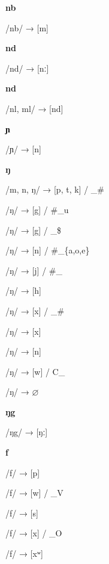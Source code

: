 \begin{center}\textbf{nb}\end{center}
\begin{multicols}{4}
\noindent /nb/ → [m]
\end{multicols}


\begin{center}\textbf{nd}\end{center}
\begin{multicols}{4}
\noindent /nd/ → [nː]
\end{multicols}


\begin{center}\textbf{nd}\end{center}
\begin{multicols}{4}
\noindent /nl, ml/ → [nd]
\end{multicols}


\begin{center}\textbf{ɲ}\end{center}
\begin{multicols}{4}
\noindent /ɲ/ → [n]
\end{multicols}


\begin{center}\textbf{ŋ}\end{center}
\begin{multicols}{4}
\noindent /m, n, ŋ/ → [p, t, k] / \_\#

\noindent /ŋ/ → [g] / \#\_u

\noindent /ŋ/ → [g] / \_\$

\noindent /ŋ/ → [n] / \#\_\{a,o,e\}

\noindent /ŋ/ → [j] / \#\_

\noindent /ŋ/ → [h]

\noindent /ŋ/ → [x] / \_\#

\noindent /ŋ/ → [x]

\noindent /ŋ/ → [n]

\noindent /ŋ/ → [w] / C\_

\noindent /ŋ/ → $\varnothing$
\end{multicols}


\begin{center}\textbf{ŋg}\end{center}
\begin{multicols}{4}
\noindent /ŋg/ → [ŋː]
\end{multicols}


\begin{center}\textbf{f}\end{center}
\begin{multicols}{4}
\noindent /f/ → [p]

\noindent /f/ → [w] / \_V

\noindent /f/ → [s]

\noindent /f/ → [x] / \_O

\noindent /f/ → [xʷ]
\end{multicols}



